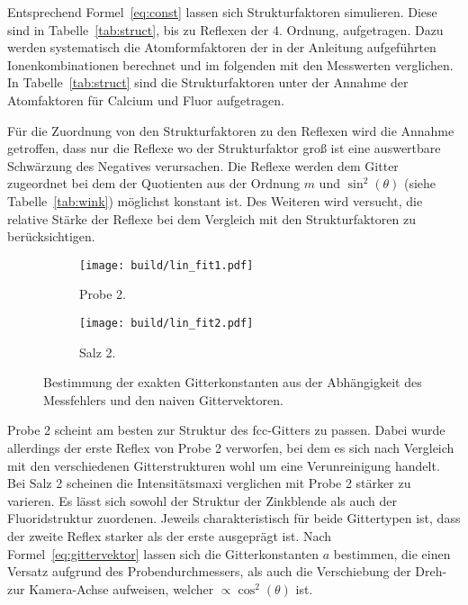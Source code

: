 Entsprechend Formel~\eqref{eq:const} lassen sich Strukturfaktoren simulieren.
Diese sind in Tabelle~\ref{tab:struct}, bis zu Reflexen der 4. Ordnung, aufgetragen.
Dazu werden systematisch die Atomformfaktoren der in der Anleitung
\cite{anleitung} aufgeführten Ionenkombinationen berechnet und im folgenden mit
den Messwerten verglichen. 
In Tabelle~\ref{tab:struct} sind die Strukturfaktoren unter der Annahme der
Atomfaktoren für Calcium und Fluor aufgetragen.

Für die Zuordnung von den Strukturfaktoren zu den Reflexen wird die Annahme
getroffen,
dass nur die Reflexe wo der Strukturfaktor groß ist eine auswertbare Schwärzung
des Negatives verursachen. 
Die Reflexe werden dem Gitter zugeordnet bei dem der Quotienten aus der Ordnung 
$m$ und $\sin^2(\theta)$ (siehe Tabelle~\ref{tab:wink}) möglichst konstant ist.
Des Weiteren wird versucht, die relative Stärke der Reflexe bei dem Vergleich mit den
Strukturfaktoren zu berücksichtigen.

\begin{figure}[ht]
		\centering
		\begin{subfigure}{0.49\textwidth}
				\centering
				\texttt{[image: build/lin\_fit1.pdf]}
				\caption{Probe 2.}
				\label{fig:prb1}
		\end{subfigure}
		\begin{subfigure}{0.49\textwidth}
				\centering
				\texttt{[image: build/lin\_fit2.pdf]}
				\caption{Salz 2.}
				\label{fig:prb1}
		\end{subfigure}
		\caption{Bestimmung der exakten Gitterkonstanten aus der Abhängigkeit
		des	Messfehlers und den naiven Gittervektoren.}
\end{figure}

Probe 2 scheint am besten zur Struktur des fcc-Gitters zu passen.
Dabei wurde allerdings der erste Reflex von Probe 2 verworfen, bei dem es sich
nach Vergleich mit den verschiedenen Gitterstrukturen wohl um eine Verunreinigung
handelt.
Bei Salz 2 scheinen die Intensitätsmaxi verglichen mit Probe 2 stärker zu
varieren. 
Es lässt sich sowohl der Struktur der Zinkblende als auch der Fluoridstruktur
zuordenen. 
Jeweils charakteristisch für beide Gittertypen ist, dass der zweite Reflex
starker als der erste ausgeprägt ist.
Nach Formel~\eqref{eq:gittervektor} lassen sich die
Gitterkonstanten $a$ bestimmen, die einen Versatz aufgrund des
Probendurchmessers, als auch die Verschiebung der Dreh- zur Kamera-Achse
aufweisen, welcher $\propto \cos^2(\theta)$ ist.

